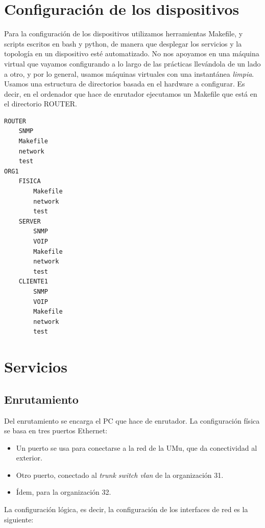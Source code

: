 \documentclass[]{article}
\begin{document}
\section{Configuración de los dispositivos}

Para la configuración de los dispositivos utilizamos herramientas Makefile, y scripts escritos en bash y python, de manera que desplegar los servicios y la topología en un dispositivo esté automatizado. No nos apoyamos en una máquina virtual que vayamos configurando a lo largo de las prácticas llevándola de un lado a otro, y por lo general, usamos máquinas virtuales con una instantánea \textit{limpia}.
\\

Usamos una estructura de directorios basada en el hardware a configurar. Es decir, en el ordenador que hace de enrutador ejecutamos un Makefile que está en el directorio ROUTER.

\begin{Verbatim}
ROUTER
	SNMP
	Makefile
	network
	test
ORG1
	FISICA
		Makefile
		network
		test
	SERVER
		SNMP
		VOIP
		Makefile
		network
		test
	CLIENTE1
		SNMP
		VOIP
		Makefile
		network
		test

\end{Verbatim}

\section{Servicios}

\subsection{Enrutamiento}

Del enrutamiento se encarga el PC que hace de enrutador. La configuración física se basa en tres puertos Ethernet:

\begin{itemize}
	\item Un puerto se usa para conectarse a la red de la UMu, que da conectividad al exterior.
	\item Otro puerto, conectado al \textit{trunk switch vlan} de la organización 31.
	\item Ídem, para la organización 32.
\end{itemize}

La configuración lógica, es decir, la configuración de los interfaces de red es la siguiente:
\end{document}
